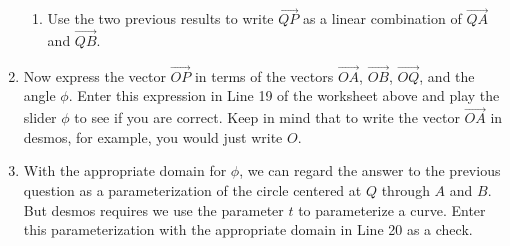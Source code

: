 \documentclass{ximera}
\begin{document}
\begin{question}
\begin{enumerate}
\begin{enumerate}
\item{Use the two previous results to write $\overrightarrow{QP}$ as a linear combination of  $\overrightarrow{QA}$ and $\overrightarrow{QB}$.
\begin{multipleChoice}
\end{multipleChoice}
}

\end{enumerate}

\item{Now express the vector $\overrightarrow{OP}$ in terms of the vectors $\overrightarrow{OA}$, $\overrightarrow{OB}$, $\overrightarrow{OQ}$, and the angle $\phi$. Enter this expression in Line 19 of the worksheet above and play the slider $\phi$ to see if you are correct. Keep in mind that to write the vector $\overrightarrow{OA}$ in desmos, for example, you would just write $O$.
}

\item{With the appropriate domain for $\phi$, we can regard the answer to the previous question as a parameterization of the circle centered at $Q$ through $A$ and $B$. But desmos requires we use the parameter $t$ to parameterize a curve. Enter this parameterization with the appropriate domain in Line 20 as a check.}

\end{enumerate} 

\end{question}
\end{document}
